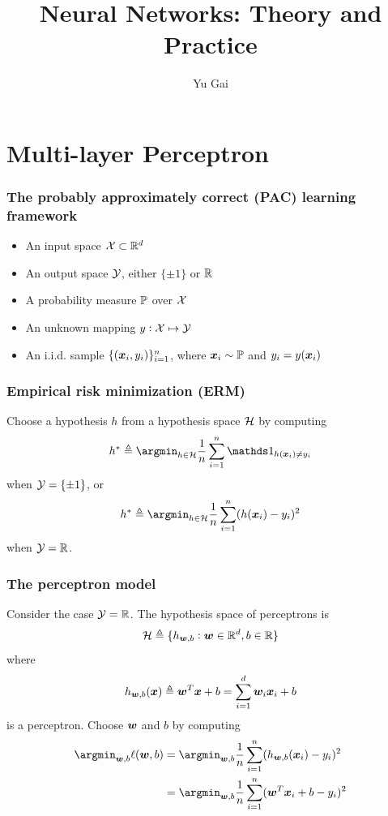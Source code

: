 \documentclass{article}
\title{Neural Networks: Theory and Practice}
\author{Yu Gai}
\date{}
\newcommand{\ind}{{\mathds 1}}
\begin{document}
\maketitle

\tableofcontents

\newpage

\section{Multi-layer Perceptron}

\subsubsection{The probably approximately correct (PAC) learning framework}

\begin{itemize}
\item An input space ${\mathcal X} \subset {\mathbb R}^d$
\item An output space ${\mathcal Y}$, either $\{\pm 1\}$ or ${\mathbb R}$
\item A probability measure ${\mathbb P}$ over ${\mathcal X}$
\item An unknown mapping $y: {\mathcal X} \mapsto {\mathcal Y}$
\item An i.i.d. sample $\{({\bm x}_i, y_i)\}_{i = 1}^n$, where ${\bm x}_i \sim {\mathbb P}$ and $y_i = y({\bm x}_i)$
\end{itemize}

\subsubsection{Empirical risk minimization (ERM)}

Choose a hypothesis $h$ from a hypothesis space ${\mathcal H}$ by computing
\[
h^* \triangleq \argmin_{h \in \calh} \frac1n \sum_{i = 1}^n \ind_{h(\bmx_i) \ne y_i}
\]
when ${\mathcal Y} = \{\pm 1\}$, or
\[
h^* \triangleq \argmin_{h \in \calh} \frac1n \sum_{i = 1}^n (h(\bmx_i) - y_i)^2
\]
when ${\mathcal Y} = {\mathbb R}$.

\subsubsection{The perceptron model}

Consider the case ${\mathcal Y} = {\mathbb R}$.
The hypothesis space of perceptrons is
\[
{\mathcal H} \triangleq \{h_{{\bm w}, b} : {\bm w} \in {\mathbb R}^d, b \in {\mathbb R}\}
\]
where
\[
h_{{\bm w}, b} ({\bm x})
\triangleq {\bm w}^T {\bm x} + b
= \sum_{i = 1}^d {\bm w}_i {\bm x}_i + b
\]
is a perceptron.
Choose ${\bm w}$ and $b$ by computing
\begin{align*}
\argmin_{\bmw, b} \ell (\bmw, b)
& = \argmin_{\bmw, b} \frac1n \sum_{i = 1}^n (h_{\bmw, b} (\bmx_i) - y_i)^2 \\
& = \argmin_{\bmw, b} \frac1n \sum_{i = 1}^n (\bmw^T \bmx_i + b - y_i)^2
\end{align*}
\end{document}
